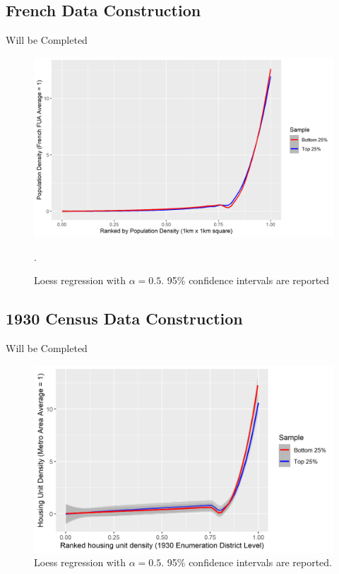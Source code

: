 \documentclass[]{article}
\begin{document}
\subsection{French Data Construction}\label{FrenchDFC}
Will be Completed
\begin{figure}[hbpt]
	\begin{center}
		\includegraphics[width=\textwidth]{tractdens_dist_france.png}
		\caption{Loess regression with $\alpha = 0.5$. 95\% confidence intervals are reported}.\label{Dens_dist_france}
	\end{center}
\end{figure}


\subsection{1930 Census Data Construction}\label{1930CensusDFC}
Will be Completed
\begin{figure}[hbpt]
	\begin{center}
		\includegraphics[width=\textwidth]{1930ED_dens_disp.png}
		\caption{Loess regression with $\alpha = 0.5$. 95\% confidence intervals are reported.}\label{Dens_dist_1930ED}
	\end{center}
\end{figure}
\end{document}
